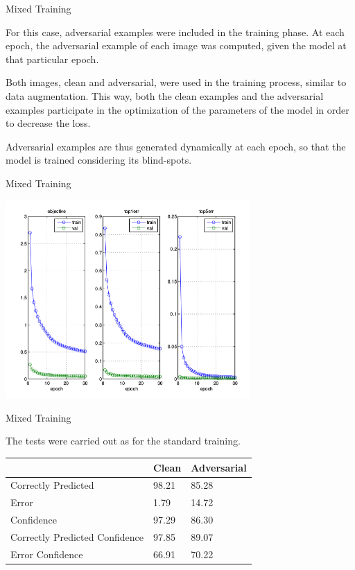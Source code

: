 \begin{tframe}{Mixed Training}

For this case, adversarial examples were included in the training phase. At each epoch, the adversarial example of each image was computed, given the model at that particular epoch. 

\vspace{0.1in}

Both images, clean and adversarial, were used in the training process, similar to data augmentation. This way, both the clean examples and the adversarial examples participate in the optimization of the parameters of the model in order to decrease the loss.

\vspace{0.1in}

Adversarial examples are thus generated dynamically at each epoch, so that the model is trained considering its blind-spots.

\end{tframe}

\begin{tframe}{Mixed Training}

\begin{center}
  \includegraphics[width=0.7\textwidth]{img/train-mix.png}
	\label{train-mix} 
\end{center}

\end{tframe}

\begin{tframe}{Mixed Training}

The tests were carried out as for the standard training.

\begin{table}[h]
\centering
\begin{tabular}{@{}lll@{}}
\toprule
                               & Clean & Adversarial \\ \midrule
Correctly Predicted            & 98.21 & 85.28       \\
Error                          & 1.79  & 14.72       \\
Confidence                     & 97.29 & 86.30       \\
Correctly Predicted Confidence & 97.85 & 89.07       \\
Error Confidence               & 66.91 & 70.22       \\ \bottomrule
\end{tabular}
\end{table}

\end{tframe}